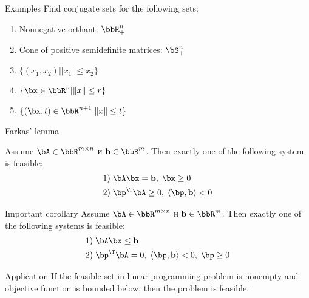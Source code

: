 \documentclass[12pt]{beamer}
\begin{document}
\begin{frame}{Examples}
Find conjugate sets for the following sets:
\begin{enumerate}
\item Nonnegative orthant: $\bbR^n_+$
\item Cone of positive semidefinite matrices: $\bS^n_+$
\item $\{ (x_1, x_2) | |x_1| \leq x_2 \}$
\item $\{ \bx \in \bbR^n | \| x \| \leq r \}$
\item $\{ (\bx, t) \in \bbR^{n+1} | \| x \| \leq t \}$
\end{enumerate}
\end{frame}

\begin{frame}{Farkas' lemma}
\scriptsize
\begin{lemma}[Farkas]
Assume $\bA \in \bbR^{m \times n}$ и $\mathbf{b} \in \bbR^m$. Then exactly one of the following system is feasible:
\vspace{-4mm}
\begin{equation*}
\begin{split}
1)& \; \bA\bx = \mathbf{b}, \; \bx \geq 0\\
2)& \; \bp^{\T}\bA \geq 0, \; \langle \bp, \mathbf{b} \rangle < 0
\end{split}
\end{equation*}
\end{lemma}

\begin{block}{Important corollary}
Assume $\bA \in \bbR^{m \times n}$ и $\mathbf{b} \in \bbR^m$. Then exactly one of the following systems is feasible:
\vspace{-4mm}
\begin{equation*}
\begin{split}
1)& \; \bA\bx \leq \mathbf{b}\\
2)& \; \bp^{\T}\bA = 0, \; \langle \bp, \mathbf{b} \rangle < 0, \; \bp \geq 0
\end{split}
\end{equation*}
\end{block}

\begin{block}{Application}
If the feasible set in linear programming problem is nonempty and objective function is bounded below, then the problem is feasible.
\end{block}

\end{frame}
\end{document}
